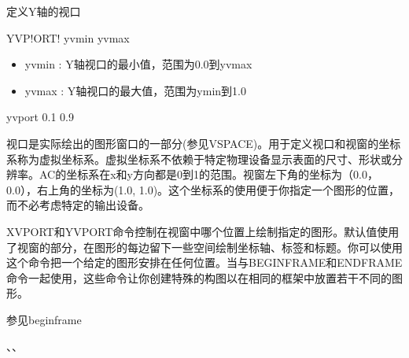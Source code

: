\label{cmd:yvport}

定义Y轴的视口

\begin{SACSTX}
YVP!ORT! yvmin yvmax
\end{SACSTX}

\begin{itemize}
\item yvmin : Y轴视口的最小值，范围为0.0到yvmax 
\item yvmax : Y轴视口的最大值，范围为ymin到1.0 
\end{itemize}

\begin{SACDFT}
yvport 0.1 0.9
\end{SACDFT}

视口是实际绘出的图形窗口的一部分(参见VSPACE)。用于定义视口和视窗的坐标系称为虚拟坐标系。虚拟坐标系不依赖于特定物理设备显示表面的尺寸、形状或分辨率。AC的坐标系在x和y方向都是0到1的范围。视窗左下角的坐标为（0.0，0.0），右上角的坐标为(1.0, 1.0)。这个坐标系的使用便于你指定一个图形的位置，而不必考虑特定的输出设备。

XVPORT和YVPORT命令控制在视窗中哪个位置上绘制指定的图形。默认值使用了视窗的部分，在图形的每边留下一些空间绘制坐标轴、标签和标题。你可以使用这个命令把一个给定的图形安排在任何位置。当与BEGINFRAME和ENDFRAME命令一起使用，这些命令让你创建特殊的构图以在相同的框架中放置若干不同的图形。

参见beginframe

、、
